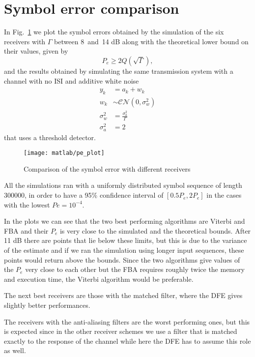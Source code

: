 \documentclass[a4paper,oneside]{article}
\newcommand{\distr}[0]{\sim}
\begin{document}
\section{Symbol error comparison}
In Fig.~\ref{plot:pe_all} we plot the symbol errors obtained by the
simulation of the six receivers with $\Gamma$ between 8~and~14 dB
along with the theoretical lower bound on their values, given by
\begin{equation}
  P_e \geq 2 Q \left(\sqrt{\Gamma}\right) ,
\end{equation}
and the results obtained by simulating the same transmission system
with a channel with no ISI and additive white noise
\begin{align}
  y_k &= a_k + w_k \\
  w_k & \distr \mathcal{CN}(0, \sigma^2_w) \\
  \sigma^2_w &= \frac{\sigma^2_a}{\Gamma} \\
  \sigma^2_a &= 2 
\end{align}
that uses a threshold detector.

\begin{figure}[htbp]
  \centering
  \texttt{[image: matlab/pe\_plot]}
  \caption{Comparison of the symbol error with different receivers}
  \label{plot:pe_all}
\end{figure}
All the simulations ran with a uniformly distributed symbol sequence
of length 300000, in order to have a 95\% confidence interval of
$[0.5P_e, 2P_e]$ in the cases with the lowest $Pe = 10^{-4}$.

In the plots we can see that the two best performing algorithms are
Viterbi and FBA and their $P_e$ is very close to the simulated and the
theoretical bounds. After {\color{red}11 dB} there are points that lie
below these limits, but this is due to the variance of the estimate
and if we ran the simulation using longer input sequences, these
points would return above the bounds. Since the two algorithms give
values of the $P_e$ very close to each other but the FBA requires
roughly twice the memory and execution time, the Viterbi algorithm
would be preferable.

The next best receivers are those with the matched filter, where the
DFE gives slightly better performances.

The receivers with the anti-aliasing filters are the worst performing
ones, but this is expected since in the other receiver schemes we use
a filter that is matched exactly to the response of the channel while
here the DFE has to assume this role as well.
\end{document}
